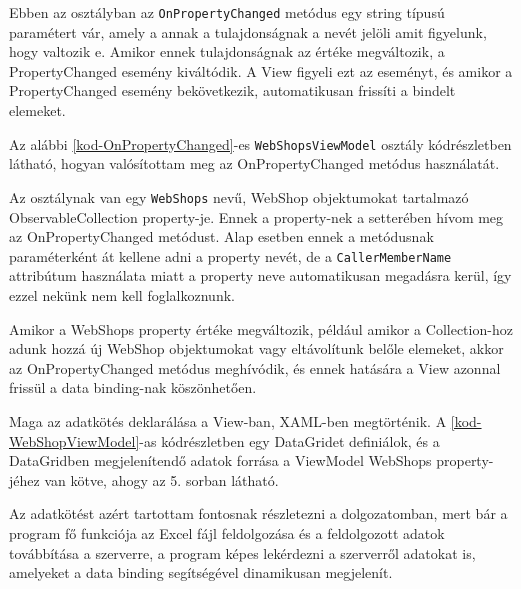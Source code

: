 \documentclass[
]{thesis-ekf}
\theoremstyle{definition}
\theoremstyle{remark}
\begin{document}


Ebben az osztályban az \texttt{OnPropertyChanged} metódus egy string típusú paramétert vár, amely a annak a tulajdonságnak a  nevét jelöli amit figyelunk, hogy valtozik e. Amikor ennek tulajdonságnak az értéke megváltozik, a PropertyChanged esemény kiváltódik. A View figyeli ezt az eseményt, és amikor a PropertyChanged esemény bekövetkezik, automatikusan frissíti a bindelt elemeket.

Az alábbi \ref{kod-OnPropertyChanged}-es \texttt{WebShopsViewModel} osztály kódrészletben látható, hogyan valósítottam meg az OnPropertyChanged metódus használatát. 

Az osztálynak van egy \texttt{WebShops} nevű, WebShop objektumokat tartalmazó ObservableCollection property-je. Ennek a property-nek a setterében hívom meg az OnPropertyChanged metódust. Alap esetben ennek a metódusnak paraméterként át kellene adni a property nevét, de a \texttt{CallerMemberName} attribútum használata miatt a property neve automatikusan megadásra kerül, így ezzel nekünk nem kell foglalkoznunk.
\newpage


Amikor a WebShops property értéke megváltozik, például amikor a Collection-hoz adunk hozzá új WebShop objektumokat vagy eltávolítunk belőle elemeket, akkor az OnPropertyChanged metódus meghívódik, és ennek hatására a View azonnal frissül a data binding-nak köszönhetően. 

Maga az adatkötés deklarálása a View-ban, XAML-ben megtörténik. A \ref{kod-WebShopViewModel}-as kódrészletben egy DataGridet definiálok, és a DataGridben megjelenítendő adatok forrása a ViewModel WebShops property-jéhez van kötve, ahogy az 5. sorban látható.


Az adatkötést azért tartottam fontosnak részletezni a dolgozatomban, mert bár a program fő funkciója az Excel fájl feldolgozása és a feldolgozott adatok továbbítása a szerverre, a program képes lekérdezni a szerverről adatokat is, amelyeket a data binding segítségével dinamikusan megjelenít.
\end{document}
